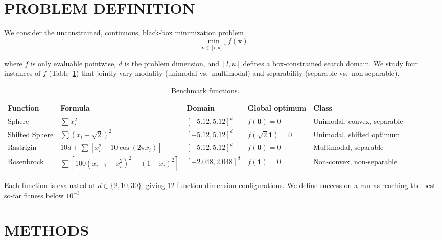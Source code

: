 \documentclass[journal]{IEEEtran}
\begin{document}
\section {PROBLEM DEFINITION}

We consider the unconstrained, continuous, black-box minimization problem
\begin{equation}
\min_{\mathbf{x} \in [l,u]^d} f(\mathbf{x})
\end{equation}

where $f$ is only evaluable pointwise, $d$ is the problem dimension, and $[l,u]$ defines a box-constrained search domain. We study four instances of $f$ (Table~\ref{tab:benchmarks}) that jointly vary modality (unimodal vs.\ multimodal) and separability (separable vs.\ non-separable).
\FloatBarrier

\begin{table}[tbp]
\centering
\caption{Benchmark functions.}
\label{tab:benchmarks}
\begin{tabular}{lllll}
\toprule
Function & Formula & Domain & Global optimum & Class \\
\midrule
Sphere & $\sum x_i^2$ & $[-5.12,5.12]^d$ & $f(\mathbf{0})=0$ & Unimodal, convex, separable \\
Shifted Sphere & $\sum (x_i-\sqrt{2})^2$ & $[-5.12,5.12]^d$ & $f(\sqrt2\mathbf{1})=0$ & Unimodal, shifted optimum \\
Rastrigin & $10d+\sum[x_i^2-10\cos(2\pi x_i)]$ & $[-5.12,5.12]^d$ & $f(\mathbf{0})=0$ & Multimodal, separable \\
Rosenbrock & $\sum[100(x_{i+1}-x_i^2)^2+(1-x_i)^2]$ & $[-2.048,2.048]^d$ & $f(\mathbf{1})=0$ & Non-convex, non-separable \\
\bottomrule
\end{tabular}
\end{table}
\FloatBarrier

Each function is evaluated at $d \in \{2,10,30\}$, giving 12 function-dimension configurations. We define success on a run as reaching the best-so-far fitness below $10^{-3}$.
\FloatBarrier

\section{METHODS}
\end{document}
